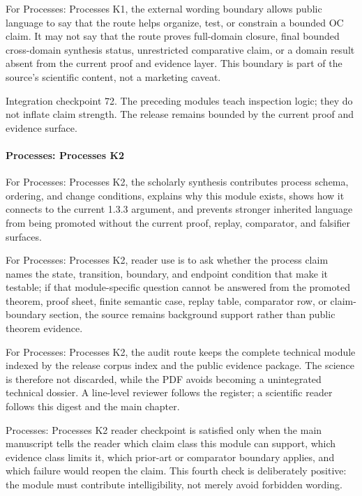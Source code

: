 For Processes: Processes K1, the external wording boundary allows public language to say that the route helps organize, test, or constrain a bounded OC claim. It may not say that the route proves full-domain closure, final bounded cross-domain synthesis status, unrestricted comparative claim, or a domain result absent from the current proof and evidence layer. This boundary is part of the source's scientific content, not a marketing caveat.


Integration checkpoint 72. The preceding modules teach inspection logic; they do not inflate claim strength. The release remains bounded by the current proof and evidence surface.


\paragraph{Processes: Processes K2}

For Processes: Processes K2, the scholarly synthesis contributes process schema, ordering, and change conditions, explains why this module exists, shows how it connects to the current 1.3.3 argument, and prevents stronger inherited language from being promoted without the current proof, replay, comparator, and falsifier surfaces.


For Processes: Processes K2, reader use is to ask whether the process claim names the state, transition, boundary, and endpoint condition that make it testable; if that module-specific question cannot be answered from the promoted theorem, proof sheet, finite semantic case, replay table, comparator row, or claim-boundary section, the source remains background support rather than public theorem evidence.


For Processes: Processes K2, the audit route keeps the complete technical module indexed by the release corpus index and the public evidence package. The science is therefore not discarded, while the PDF avoids becoming a unintegrated technical dossier. A line-level reviewer follows the register; a scientific reader follows this digest and the main chapter.


Processes: Processes K2 reader checkpoint is satisfied only when the main manuscript tells the reader which claim class this module can support, which evidence class limits it, which prior-art or comparator boundary applies, and which failure would reopen the claim. This fourth check is deliberately positive: the module must contribute intelligibility, not merely avoid forbidden wording.



